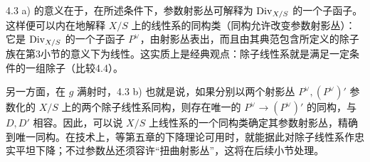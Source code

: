 4.3 a) 的意义在于，在所述条件下，参数射影丛可解释为 \(\operatorname{Div}_{X/S}\) 的一个子函子。这样便可以内在地解释 \(X/S\) 上的线性系的同构类（同构允许改变参数射影丛）：它是 \(\operatorname{Div}_{X/S}\) 的一个子函子 \(P^\vee\)，由射影丛表出，而且由其典范包含所定义的除子族在第3小节的意义下为线性。这实质上是经典观点：除子线性系就是满足一定条件的一组除子（比较4.4）。

另一方面，在 \(g\) 满射时，4.3 b) 也就是说，如果分别以两个射影丛 \(P^\vee,(P^\vee)'\) 参数化的 \(X/S\) 上的两个除子线性系同构，则存在唯一的 \(P^\vee\to(P^\vee)'\) 的同构，与 \(D,D'\) 相容。因此，可以说 \(X/S\) 上线性系的一个同构类确定其参数射影丛，精确到唯一同构。在技术上，等第五章的下降理论可用时，就能据此对除子线性系作忠实平坦下降；不过参数丛还须容许“扭曲射影丛”，这将在后续小节处理。
\par\endgroup
